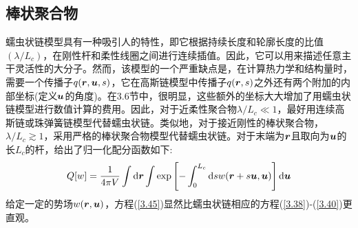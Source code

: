 \subsection{棒状聚合物}
蠕虫状链模型具有一种吸引人的特性，即它根据持续长度和轮廓长度的比值$(\lambda/L_c)$，在刚性杆和柔性线圈之间进行连续插值。因此，它可以用来描述任意主干灵活性的大分子。然而，该模型的一个严重缺点是，在计算热力学和结构量时，需要一个传播子$q(\bm{r},\bm{u},s)$，它在高斯链模型中传播子$q(\bm{r},s)$之外还有两个附加的内部坐标(定义$\bm{u}$的角度)。在3.6节中，很明显，这些额外的坐标大大增加了用蠕虫状链模型进行数值计算的费用。因此，对于近柔性聚合物$\lambda/L_c\ll 1$，最好用连续高斯链或珠弹簧链模型代替蠕虫状链。类似地，对于接近刚性的棒状聚合物，$\lambda/L_c\gtrsim 1$，采用严格的棒状聚合物模型代替蠕虫状链。对于末端为$\bm{r}$且取向为$\bm{u}$的长$L_c$的杆，给出了归一化配分函数如下:
\begin{equation}\label{3.45}
Q[w]=\frac{1}{4\pi V}\int\mathrm{d}\bm{r}\int\exp\left[-\int_0^{L_c}\mathrm{d}sw(\bm{r}+s\bm{u},\bm{u})\right]\mathrm{d}\bm{u}
\end{equation}
给定一定的势场$w(\bm{r},\bm{u})$，方程(\ref{3.45})显然比蠕虫状链相应的方程(\ref{3.38})-(\ref{3.40})更直观。










































































































